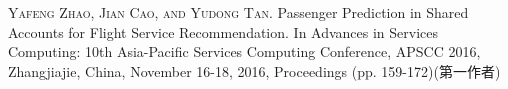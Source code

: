 
\begin{publications}{99}
    \item\textsc{Yafeng Zhao, Jian Cao, and Yudong Tan}. {Passenger Prediction in Shared Accounts for Flight Service Recommendation}. In Advances in Services Computing: 10th Asia-Pacific Services Computing Conference, APSCC 2016, Zhangjiajie, China, November 16-18, 2016, Proceedings (pp. 159-172)(第一作者)
\end{publications}
